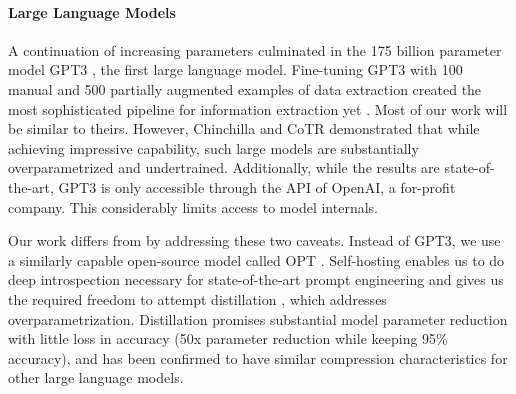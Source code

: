 \paragraph{Large Language Models}
A continuation of increasing parameters culminated in the 175 billion parameter
model GPT3 \cite{brown_language_2020}, the first large language model. Fine-tuning
GPT3 with 100 manual and 500 partially augmented examples of data extraction
created the most sophisticated pipeline for information extraction yet
\cite{dunn_structured_2022}. Most of our work will be similar to theirs. However,
Chinchilla \cite{hoffmann_training_2022} and CoTR \cite{zhang_multimodal_2023}
demonstrated that while achieving impressive capability, such large models are
substantially overparametrized and undertrained. Additionally, while the
results are state-of-the-art, GPT3 is only accessible through the API of
OpenAI, a for-profit company. This considerably limits access to model
internals.

Our work differs from \cite{dunn_structured_2022} by addressing these two
caveats. Instead of GPT3, we use a similarly capable open-source model called
OPT \cite{zhang_opt_2022}. Self-hosting enables us to do deep introspection
necessary for state-of-the-art prompt engineering and gives us the required
freedom to attempt distillation \cite{sun_patient_2019}, which addresses
overparametrization. Distillation promises substantial model parameter
reduction with little loss in accuracy (50x parameter reduction while keeping
95\% accuracy), and has been confirmed to have similar compression characteristics
for other large language models.
